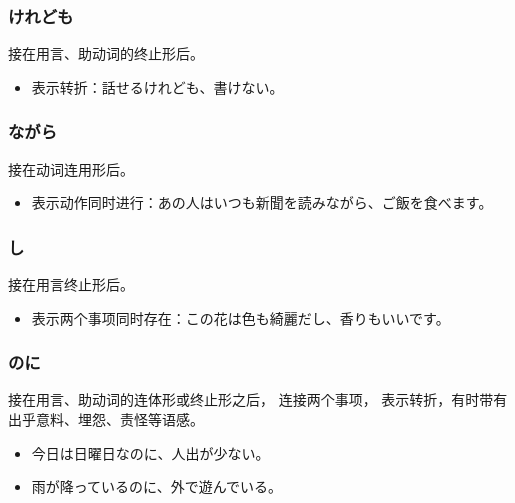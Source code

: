 \subsubsection{けれども}%

接在用言、助动词的终止形后。
\begin{itemize}
  \item 表示转折：話せるけれども、書けない。
\end{itemize}


\subsubsection{ながら}%

接在动词连用形后。
\begin{itemize}
  \item 表示动作同时进行：あの人はいつも新聞を読みながら、ご飯を食べます。
\end{itemize}


\subsubsection{し}%

接在用言终止形后。
\begin{itemize}
  \item 表示两个事项同时存在：この花は色も綺麗だし、香りもいいです。
\end{itemize}


\subsubsection{のに}%

接在用言、助动词的连体形或终止形之后，
连接两个事项，
表示转折，有时带有出乎意料、埋怨、责怪等语感。
\begin{itemize}
  \item 今日は日曜日なのに、人出が少ない。
  \item 雨が降っているのに、外で遊んでいる。
\end{itemize}
